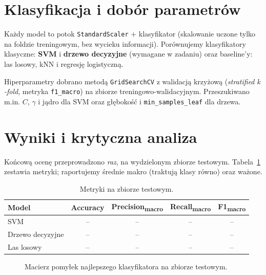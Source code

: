 \documentclass[10pt,a4paper]{article}
\begin{document}
\section{Klasyfikacja i dobór parametrów}
Każdy model to potok \texttt{StandardScaler} $+$ klasyfikator (skalowanie uczone
tylko na foldzie treningowym, bez wycieku informacji). Porównujemy klasyfikatory
klasyczne: \textbf{SVM} i \textbf{drzewo decyzyjne} (wymagane w zadaniu) oraz
baseline'y: las losowy, kNN i regresję logistyczną.

Hiperparametry dobrano metodą \texttt{GridSearchCV} z walidacją krzyżową
(\emph{stratified $k$-fold}, metryka \texttt{f1\_macro}) na zbiorze
treningowo-walidacyjnym. %
Przeszukiwano m.in. $C$, $\gamma$ i jądro dla SVM oraz głębokość i
\texttt{min\_samples\_leaf} dla drzewa.

\section{Wyniki i krytyczna analiza}
Końcową ocenę przeprowadzono \emph{raz}, na wydzielonym zbiorze testowym.
Tabela~\ref{tab:wyniki} zestawia metryki; raportujemy średnie makro
(traktują klasy równo) oraz ważone.

\begin{table}[h]
  \centering\small
  \caption{Metryki na zbiorze testowym. %
  }
  \label{tab:wyniki}
  \begin{tabular}{lcccc}
    \toprule
    Model & Accuracy & Precision\textsubscript{macro} & Recall\textsubscript{macro} & F1\textsubscript{macro} \\
    \midrule
    SVM              & -- & -- & -- & -- \\
    Drzewo decyzyjne & -- & -- & -- & -- \\
    Las losowy       & -- & -- & -- & -- \\
    \bottomrule
  \end{tabular}
\end{table}

\begin{figure}[h]
  \centering
  \caption{Macierz pomyłek najlepszego klasyfikatora na zbiorze testowym.}
  \label{fig:cm}
\end{figure}
\end{document}
